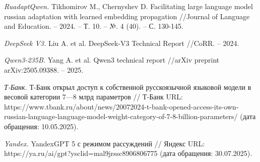 \documentclass{article}
\begin{document}
\begin{thebibliography}{99}
\textit{RuadaptQwen.}
Tikhomirov M., Chernyshev D. Facilitating large language model russian adaptation with learned embedding propagation //Journal of Language and Education. – 2024. – Т. 10. – №. 4 (40). – С. 130-145.

\textit{DeepSeek V3.}
Liu A. et al. DeepSeek-V3 Technical Report //CoRR. – 2024.

\textit{Qwen3-235B.}
Yang A. et al. Qwen3 technical report //arXiv preprint arXiv:2505.09388. – 2025.

\textit{Т-Банк.}
Т-Банк открыл доступ к собственной русскоязычной языковой модели в весовой категории 7—8 млрд параметров 
// Т-Банк URL: https://www.tbank.ru/about/news/20072024-t-bank-opened-access-its-own-russian-language-language-model-weight-category-of-7-8-billion-parameters/ (дата обращения: 10.05.2025).

\textit{Yandex.}
YandexGPT 5 с режимом рассуждений // Яндекс URL: https://ya.ru/ai/gpt?ysclid=mal9jrssc8906806775 (дата обращения: 30.07.2025).

\end{thebibliography}

\renewcommand\refname{References}
\end{document}
